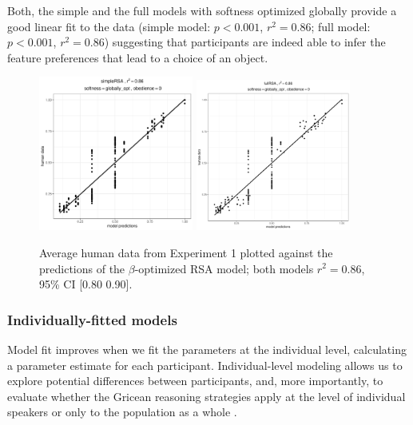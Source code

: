 \documentclass[10pt,a4paper]{article}
\newcommand{\gcs}[1]{\textcolor{blue}{[gcs: #1]}}
\begin{document}
Both, the simple and the full models with softness optimized globally provide a good linear fit to the data (simple model: $p < 0.001$, $r^2 = 0.86$; full model: $p < 0.001$, $r^2 = 0.86$) suggesting that participants are indeed able to infer the feature preferences that lead to a choice of an object.

\begin{figure}[ht]
	\centering
	\includegraphics[width=2in]{images/m13.pdf}
	\includegraphics[width=2in]{images/m23.pdf}
	\caption{Average human data from Experiment 1 plotted against the predictions of the $\beta$-optimized RSA model; both models $r^{2}=0.86$, 95\% CI [0.80 0.90].}\label{simple-full}
\end{figure}


\subsubsection{Individually-fitted models}

Model fit improves when we fit the parameters at the individual level, calculating a parameter estimate for each participant. Individual-level modeling allows us to explore potential differences between participants, and, more importantly, to evaluate whether the Gricean reasoning strategies apply at the level of individual speakers or only to the population as a whole \cite{franke2016reasoning}. 
\end{document}
